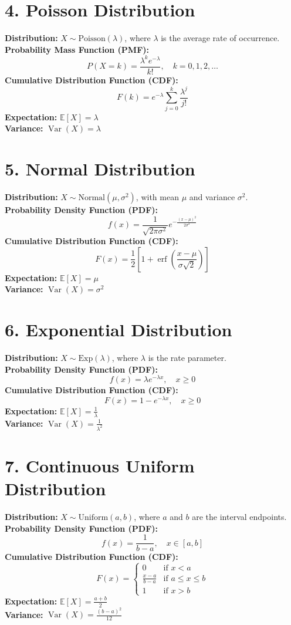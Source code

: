 \section*{4. Poisson Distribution}
\textbf{Distribution:} \( X \sim \text{Poisson}(\lambda) \), where \( \lambda \) is the average rate of occurrence.\\
\textbf{Probability Mass Function (PMF):}
\[
P(X = k) = \frac{\lambda^k e^{-\lambda}}{k!}, \quad k = 0, 1, 2, \ldots
\]
\textbf{Cumulative Distribution Function (CDF):}
\[
F(k) = e^{-\lambda} \sum_{j=0}^{k} \frac{\lambda^j}{j!}
\]
\textbf{Expectation:} \( \mathbb{E}[X] = \lambda \)\\
\textbf{Variance:} \( \operatorname{Var}(X) = \lambda \)

\section*{5. Normal Distribution}
\textbf{Distribution:} \( X \sim \text{Normal}(\mu, \sigma^2) \), with mean \( \mu \) and variance \( \sigma^2 \).\\
\textbf{Probability Density Function (PDF):}
\[
f(x) = \frac{1}{\sqrt{2 \pi \sigma^2}} e^{-\frac{(x - \mu)^2}{2 \sigma^2}}
\]
\textbf{Cumulative Distribution Function (CDF):}
\[
F(x) = \frac{1}{2} \left[ 1 + \operatorname{erf}\left( \frac{x - \mu}{\sigma \sqrt{2}} \right) \right]
\]
\textbf{Expectation:} \( \mathbb{E}[X] = \mu \)\\
\textbf{Variance:} \( \operatorname{Var}(X) = \sigma^2 \)

\section*{6. Exponential Distribution}
\textbf{Distribution:} \( X \sim \text{Exp}(\lambda) \), where \( \lambda \) is the rate parameter.\\
\textbf{Probability Density Function (PDF):}
\[
f(x) = \lambda e^{-\lambda x}, \quad x \geq 0
\]
\textbf{Cumulative Distribution Function (CDF):}
\[
F(x) = 1 - e^{-\lambda x}, \quad x \geq 0
\]
\textbf{Expectation:} \( \mathbb{E}[X] = \frac{1}{\lambda} \)\\
\textbf{Variance:} \( \operatorname{Var}(X) = \frac{1}{\lambda^2} \)

\section*{7. Continuous Uniform Distribution}
\textbf{Distribution:} \( X \sim \text{Uniform}(a, b) \), where \( a \) and \( b \) are the interval endpoints.\\
\textbf{Probability Density Function (PDF):}
\[
f(x) = \frac{1}{b - a}, \quad x \in [a, b]
\]
\textbf{Cumulative Distribution Function (CDF):}
\[
F(x) = 
\begin{cases} 
0 & \text{if } x < a \\ 
\frac{x - a}{b - a} & \text{if } a \le x \le b \\ 
1 & \text{if } x > b 
\end{cases}
\]
\textbf{Expectation:} \( \mathbb{E}[X] = \frac{a + b}{2} \)\\
\textbf{Variance:} \( \operatorname{Var}(X) = \frac{(b - a)^2}{12} \)